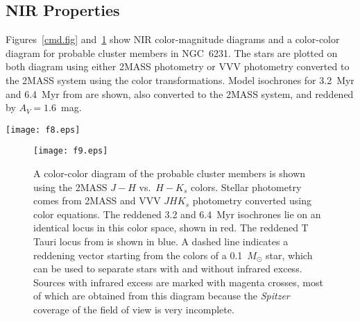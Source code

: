 \documentclass[twocolumn,tighten]{aastex61}
\begin{document}

\subsection{NIR Properties \label{nir2.sec}}

Figures~\ref{cmd.fig} and~\ref{ccd.fig} show NIR color-magnitude diagrams and a color-color diagram for probable cluster members in NGC~6231. The stars are plotted on both diagram using either 2MASS photometry or VVV photometry converted to the 2MASS system using the \citet{2013A&A...552A.101S} color transformations. Model isochrones for 3.2~Myr and 6.4~Myr from \citet{2000A&A...358..593S} are shown, also converted to the 2MASS system, and reddened by $A_V=1.6$~mag.

\begin{figure*}[t!]
\centering
\texttt{[image: f8.eps]} 
\caption{Color-magnitude diagrams of the probable cluster members are shown using the 2MASS $JHK_s$ system. Stellar photometry comes from 2MASS and VVV $JHK_s$ photometry converted using color equations. Lines indicate the 3.2 and 6.4~Myr pre--main-sequence isochrone models from \citet{2000A&A...358..593S} for an assumed distance modulus of 11.0 and an absorption of $A_V=1.6$~mag. Sources with infrared excess are marked with magenta crosses. The gray arrows are the $A_V=5$~mag reddening vectors of \citet{1985ApJ...288..618R}. 
 \label{cmd.fig}}
\end{figure*}


\begin{figure}[h]
\centering
\texttt{[image: f9.eps]} 
\caption{A color-color diagram of the probable cluster members is shown using the 2MASS $J-H$ vs.\ $H-K_s$ colors. Stellar photometry comes from 2MASS and VVV $JHK_s$ photometry converted using color equations. The reddened 3.2 and 6.4~Myr \citet{2000A&A...358..593S} isochrones lie on an identical locus in this color space, shown in red. The reddened T Tauri locus from  \citet{2014ApJ...787..108G} is shown in blue. A dashed line indicates a reddening vector starting from the colors of a 0.1~$M_\odot$ star, which can be used to separate stars with and without infrared excess. Sources with infrared excess are marked with magenta crosses, most of which are obtained from this diagram because the {\it Spitzer} coverage of the field of view is very incomplete. 
 \label{ccd.fig}}
\end{figure}
\end{document}
